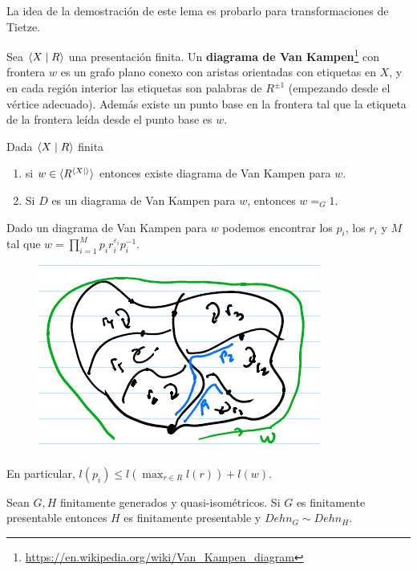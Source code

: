 \documentclass[twoside, 11pt]{article}
\begin{document}
La idea de la demostración de este lema es probarlo para transformaciones de Tietze. 

Sea $\langle{X\mid R}\rangle$ una presentación finita. Un \textbf{diagrama de Van Kampen}\footnote{\url{https://en.wikipedia.org/wiki/Van_Kampen_diagram}} con frontera $w$ es un grafo plano conexo con aristas orientadas con etiquetas en $X$, y en cada región interior las etiquetas son palabras de $R^{\pm 1}$ (empezando desde el vértice adecuado). Además existe un punto base en la frontera tal que la etiqueta de la frontera leída desde el punto base es $w$. 

\begin{teorema}
Dada $\langle{X\mid R}\rangle$ finita
\begin{enumerate}
\item si $w\in \langle{R^{\langle{X\mid }\rangle}}\rangle$ entonces existe diagrama de Van Kampen para $w$.
\item Si $D$ es un diagrama de Van Kampen para $w$, entonces $w=_G 1$.
\end{enumerate}
\end{teorema}

\begin{observacion}
Dado un diagrama de Van Kampen para $w$ podemos encontrar los $p_i$, los $r_i$ y $M$ tal que $w=\prod_{i=1}^M p_i r_i^{\varepsilon_i} p_i^{-1}$.

\begin{figure}[h!]
\includegraphics[scale=0.6]{palabra}
\end{figure}

En particular, $l(p_i)\leq l(\max_{r\in R} l(r))+l(w)$.
\end{observacion}

\begin{teorema}
Sean $G,H$ finitamente generados y quasi-isométricos. Si $G$ es finitamente presentable entonces $H$ es finitamente presentable y $Dehn_G\sim Dehn_H$.
\end{teorema}
\end{document}
